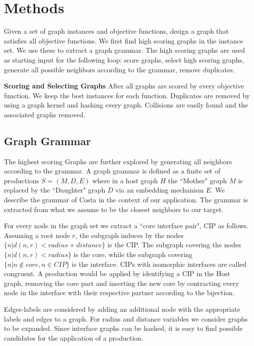 \documentclass{esannV2}
\begin{document}

\section{Methods}
Given a set of graph instances and objective functions, 
design a graph that satisfies all objective functions. 
We first find high scoring graphs in the instance set. We use these to extract a graph grammar. 
The high scoring graphs are used as starting input for the following loop: 
score graphs, 
select high scoring graphs, 
generate all possible neighbors according to the grammar, 
remove duplicates.

\textbf{Scoring and Selecting Graphs}
After all graphs are scored by every objective function. We keep the best instances for 
each function.  
Duplicates are removed by using a graph kernel and hashing every graph. 
Collisions are easily found and the associated graphs removed.

\subsection{Graph Grammar}
The highest scoring Graphs are further explored by generating all neighbors according to 
the grammar. A graph grammar is defined as a finite set of productions $S=(M,D,E)$ where in 
a host graph $H$ the ``Mother" graph $M$ is replaced by the ``Daughter" graph $D$ via an 
embedding mechanism $E$. We describe the grammar of Costa \cite{costa16gl} in the context of our application.
The grammar is extracted from what we assume to be the closest neighbors to our target.

For every node in the graph set we extract a ``core interface pair", CIP as follows.
Assuming a root node $r$, 
the subgraph induces by the nodes $\{ n | d(n,r) < radius+distance \}$ is the CIP.
The subgraph covering the nodes $\{ n | d(n,r) < radius \}$ is the core, while the subgraph covering
$\{ n | n \notin core , n \in CIP \}$ is the interface.
CIPs with isomorphic interfaces are called congruent.
A production would be applied by identifying a CIP in the Host graph, 
removing the core part and inserting the 
new core by contracting every node in the interface 
with their respective partner according to the bijection.

Edges-labels are considered by adding an additional node with the appropriate labels and edges to
a graph. For radius and distance variables we consider graphs to be expanded.
Since interface graphs can be hashed, it is easy to find possible
candidates for the application of a production. 
\end{document}

